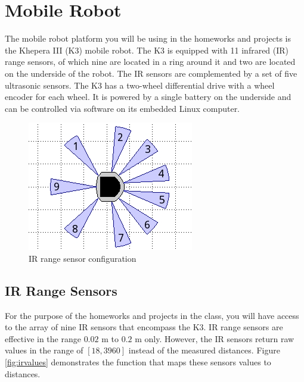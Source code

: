 \documentclass[10pt]{article}
\begin{document}
\section*{Mobile Robot}

The mobile robot platform you will be using in the homeworks and projects is the Khepera III (K3) mobile robot. The K3 is equipped with 11 infrared (IR) range sensors, of which nine are located in a ring around it and two are located on the underside of the robot. The IR sensors are complemented by a set of five ultrasonic sensors. The K3 has a two-wheel differential drive with a wheel encoder for each wheel. It is powered by a single battery on the underside and can be controlled via software on its embedded Linux computer.
\begin{figure}
 \centering
 \includegraphics[bb=0 0 274 214,scale=0.6]{k3sensors.png}
 \caption{IR range sensor configuration}
 \label{fig:k3sensors}
\end{figure}




\subsection*{IR Range Sensors}
For the purpose of the homeworks and projects in the class, you will have access to the array of nine IR sensors that encompass the K3. IR range sensors are effective in the range $0.02$ m to $0.2$ m only. However, the IR sensors return raw values in the range of $[18,3960]$ instead of the measured distances. Figure \ref{fig:irvalues} demonstrates the function that maps these sensors values to distances.
\end{document}
